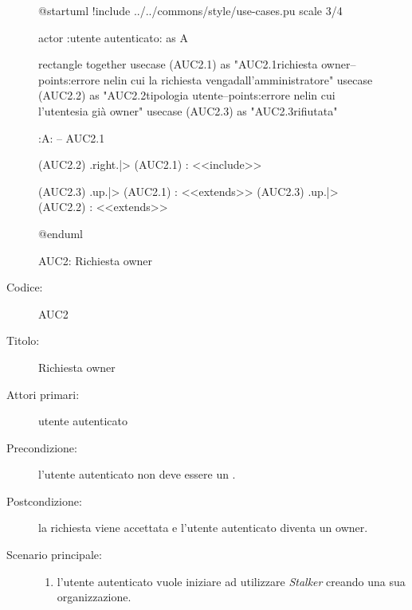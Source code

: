 \documentclass[../../../analisi-dei-requisiti.tex]{subfiles}
\begin{document}
\begin{figure}[h!]
  \centering
  \begin{plantuml}
  @startuml
  !include ../../commons/style/use-cases.pu
  scale 3/4

  actor :utente autenticato: as A

  rectangle {
    together {
      usecase (AUC2.1) as "AUC2.1\nInvio richiesta owner\n--\nExtension points:\nVisualizzazione errore nel\ncaso in cui la richiesta venga\nrifiutata dall'amministratore"
      usecase (AUC2.2) as "AUC2.2\nVerifica tipologia utente\n--\nExtension points:\nVisualizzazione errore nel\ncaso in cui l'utente\nautenticato sia già owner"
    }
      usecase (AUC2.3) as "AUC2.3\nRichiesta rifiutata"
    }

  :A: -- AUC2.1

  (AUC2.2) .right.|> (AUC2.1) : <<include>>

  (AUC2.3) .up.|> (AUC2.1) : <<extends>>
  (AUC2.3) .up.|> (AUC2.2) : <<extends>>

  @enduml
  \end{plantuml}
  \caption{AUC2: Richiesta owner}
  \label{fig:auc2}
\end{figure}

\begin{description}
  \item[Codice:] AUC2
  \item[Titolo:] Richiesta owner
  \item[Attori primari:] utente autenticato
  \item[Precondizione:] l'utente autenticato non deve essere un .
  \item[Postcondizione:] la richiesta viene accettata e l'utente autenticato diventa un owner.
  \item[Scenario principale:]
  \begin{enumerate}
    \item l'utente autenticato vuole iniziare ad utilizzare \emph{Stalker} creando una sua organizzazione.
  \end{enumerate}
\end{description}
\end{document}
